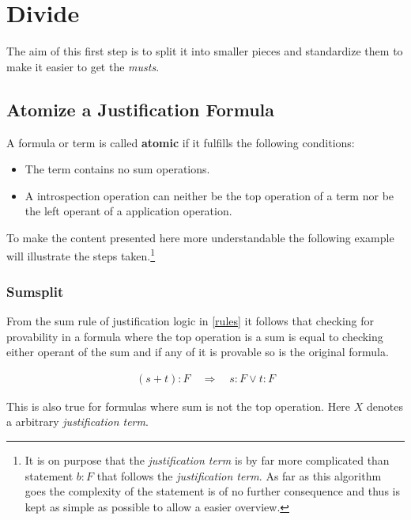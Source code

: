 \section{Divide}\label{chap:Algorithm.divide}
The aim of this first step is to split it into smaller pieces and standardize them to make it easier to get the \emph{musts}.

\subsection{Atomize a Justification Formula}\label{chap:Algorithm.atomize}
\begin{definition}[atomic]
	A formula or term is called \textbf{atomic} if it fulfills the following conditions:
	\begin{itemize}
		\item The term contains no sum operations.
		\item A introspection operation can neither be the top operation of a term nor be the left operant of a application operation.
	\end{itemize}	
\end{definition}
To make the content presented here more understandable the following example will illustrate the steps taken.\footnote{It is on purpose that the \emph{justification term} is by far more complicated than statement $b:F$ that follows the \emph{justification term}. As far as this algorithm goes the complexity of the statement is of no further consequence and thus is kept as simple as possible to allow a easier overview.}

\subsubsection{Sumsplit}
\label{sumsplit}
From the sum rule of justification logic in \ref{rules} it follows that checking for provability in a formula where the top operation is a sum is equal to checking either operant of the sum and if any of it is provable so is the original formula.

\begin{align}\label{ss1}
	(s+t):F \quad \Rightarrow \quad s:F \lor t:F
\end{align}



This is also true for formulas where sum is not the top operation. Here $X$ denotes a arbitrary \emph{justification term}.

